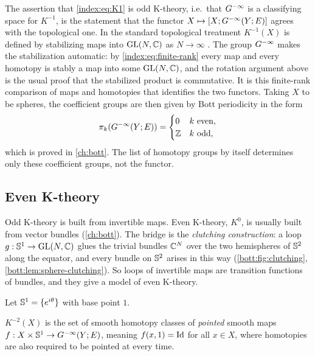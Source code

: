 \begin{remark}\label{index:rem:pi-k}
  The assertion that \eqref{index:eq:K1} is odd K-theory, i.e.\ that $G^{-\infty}$
  is a classifying space for $K^{-1}$, is the statement that the functor
  $X\mapsto[X;G^{-\infty}(Y;E)]$ agrees with the topological one. In the standard
  topological treatment $K^{-1}(X)$ is defined by stabilizing maps into
  $\operatorname{GL}(N,\mathbb{C})$ as $N\to\infty$ \cite{Atiyah-K}. The group $G^{-\infty}$ makes the
  stabilization automatic: by \eqref{index:eq:finite-rank} every map and
  every homotopy is stably a map into some $\operatorname{GL}(N,\mathbb{C})$, and the rotation
  argument above is the usual proof that the stabilized product is
  commutative. It is this finite-rank comparison of maps and homotopies that
  identifies the two functors. Taking $X$ to be spheres, the coefficient
  groups are then given by Bott periodicity in the form
  \begin{equation}\label{index:eq:homotopy-groups}
    \pi_k(G^{-\infty}(Y;E))=\begin{cases}0&k\text{ even},\\ \mathbb{Z}&k\text{ odd},
    \end{cases}
  \end{equation}
  which is proved in \cref{ch:bott}. The list of homotopy groups by itself
  determines only these coefficient groups, not the functor.
\end{remark}

\subsection{Even K-theory}
Odd K-theory is built from invertible maps. Even K-theory, $K^0$, is usually
built from vector bundles (\cref{ch:bott}). The bridge is the \emph{clutching
construction}: a loop $g:\mathbb{S}^1\to\operatorname{GL}(N,\mathbb{C})$ glues the trivial bundles
$\mathbb{C}^N$ over the two hemispheres of $\mathbb{S}^2$ along the equator, and every
bundle on $\mathbb{S}^2$ arises in this way (\cref{bott:fig:clutching},
\cref{bott:lem:sphere-clutching}). So loops of invertible maps are transition
functions of bundles, and they give a model of even K-theory.

Let $\mathbb{S}^1=\{e^{i\theta}\}$ with base point $1$.

\begin{definition}\label{index:def:K2}
  $K^{-2}(X)$ is the set of smooth homotopy classes of \emph{pointed} smooth
  maps $f:X\times\mathbb{S}^1\to G^{-\infty}(Y;E)$, meaning $f(x,1)=\operatorname{Id}$ for all $x\in X$,
  where homotopies are also required to be pointed at every time.
\end{definition}

